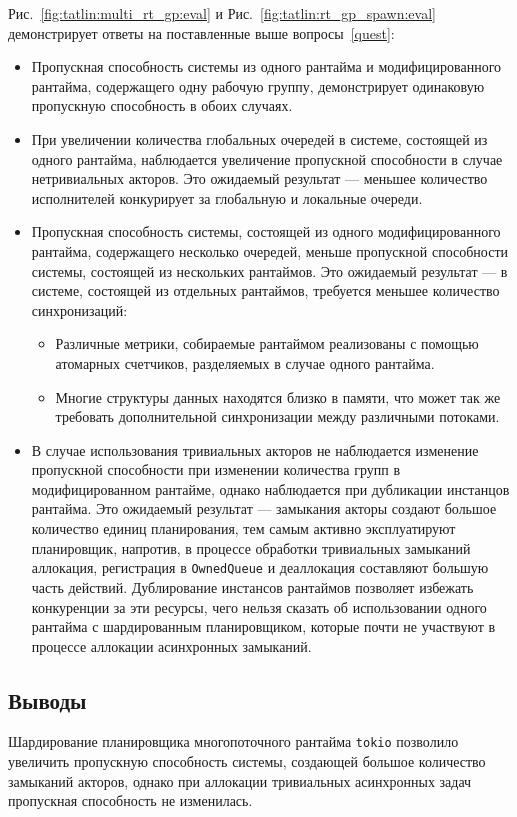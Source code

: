 Рис.~\ref{fig:tatlin:multi_rt_gp:eval} и Рис.~\ref{fig:tatlin:rt_gp_spawn:eval} демонстрирует ответы на поставленные выше вопросы~\ref{quest}:

\begin{itemize}
    \item Пропускная способность системы из одного рантайма и модифицированного рантайма, содержащего одну рабочую группу, демонстрирует одинаковую пропускную способность в обоих случаях.
    \item При увеличении количества глобальных очередей в системе, состоящей из одного рантайма, наблюдается увеличение пропускной способности в случае нетривиальных акторов. Это ожидаемый результат --- меньшее количество исполнителей конкурирует за глобальную и локальные очереди.
    \item Пропускная способность системы, состоящей из одного модифицированного рантайма, содержащего несколько очередей, меньше пропускной способности системы, состоящей из нескольких рантаймов. Это ожидаемый результат --- в системе, состоящей из отдельных рантаймов, требуется меньшее количество синхронизаций:
    \begin{itemize}
        \item Различные метрики, собираемые рантаймом реализованы с помощью атомарных счетчиков, разделяемых в случае одного рантайма.
        \item Многие структуры данных находятся близко в памяти, что может так же требовать дополнительной синхронизации между различными потоками.
    \end{itemize}
    \item В случае использования тривиальных акторов не наблюдается изменение пропускной способности при изменении количества групп в модифицированном рантайме, однако наблюдается при дубликации инстанцов рантайма. Это ожидаемый результат --- замыкания акторы создают большое количество единиц планирования, тем самым активно эксплуатируют планировщик, напротив, в процессе обработки тривиальных замыканий аллокация, регистрация в \verb|OwnedQueue| и деаллокация составляют большую часть действий. Дублирование инстансов рантаймов позволяет избежать конкуренции за эти ресурсы, чего нельзя сказать об использовании одного рантайма с шардированным планировщиком, которые почти не участвуют в процессе аллокации асинхронных замыканий.
\end{itemize}

\subsection{Выводы}

Шардирование планировщика многопоточного рантайма \verb|tokio| позволило увеличить пропускную способность системы, создающей большое количество замыканий акторов, однако при аллокации тривиальных асинхронных задач пропускная способность не изменилась.
